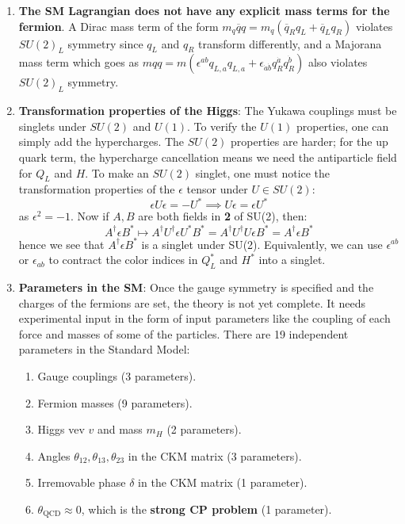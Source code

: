 \documentclass[11pt, oneside]{article}   	%
\theoremstyle{definition}
\begin{document}
\begin{enumerate}
	\item \textbf{The SM Lagrangian does not have any explicit mass terms for the fermion}. A Dirac mass term of the form 
	$m_q \overline q q = m_q(\overline q_R q_L + \overline q_L q_R)$ violates $SU(2)_L$ symmetry since $q_L$ and $q_R$ 
	transform differently, and a Majorana mass term which goes as $mqq = m(\epsilon^{ab} q_{L, a} q_{L, a} + \epsilon_{\dot a\dot b} 
	q_R^{\dot a} q_R^{\dot b})$ also violates $SU(2)_L$ symmetry. 
	\item \textbf{Transformation properties of the Higgs}: The Yukawa couplings must be singlets under $SU(2)$ and $U(1)$. 
	To verify the $U(1)$ properties, one can simply add the hypercharges. The $SU(2)$ properties are harder; for the 
	up quark term, the hypercharge cancellation means we need the antiparticle field for $Q_L$ and $H$. To make an 
	$SU(2)$ singlet, one must notice the transformation properties of the $\epsilon$ tensor under $U\in SU(2)$:
	\begin{equation}
		\epsilon U\epsilon = - U^*\implies U\epsilon = \epsilon U^*
	\end{equation}
	as $\epsilon^2 = -1$. Now if $A, B$ are both fields in \textbf{2} of SU(2), then:
	\begin{equation}
		A^\dagger \epsilon B^* \mapsto A^\dagger U^\dagger \epsilon U^*  B^* = A^\dagger U^\dagger U \epsilon B^* = 
		A^\dagger \epsilon B^*
	\end{equation}
	hence we see that $A^\dagger \epsilon B^*$ is a singlet under SU(2). Equivalently, we can use $\epsilon^{ab}$ or $\epsilon_{ab}$ to 
	contract the color indices in $Q_L^*$ and $H^*$ into a singlet.
	\item \textbf{Parameters in the SM}: Once the gauge symmetry is specified and the charges of the 
	fermions are set, the theory is not yet complete. It needs experimental input in the form of input parameters like the coupling of 
	each force and masses of some of the particles. There are 19 independent parameters in the Standard Model:
\begin{enumerate}
	\item Gauge couplings (3 parameters).
	\item Fermion masses (9 parameters).
	\item Higgs vev $v$ and mass $m_H$ (2 parameters). 
	\item Angles $\theta_{12}, \theta_{13}, \theta_{23}$ in the CKM matrix (3 parameters).
	\item Irremovable phase $\delta$ in the CKM matrix (1 parameter). 
	\item $\theta_\mathrm{QCD}\approx 0$, which is the \textbf{strong CP problem} (1 parameter).
\end{enumerate}
\end{enumerate}
\end{document}
